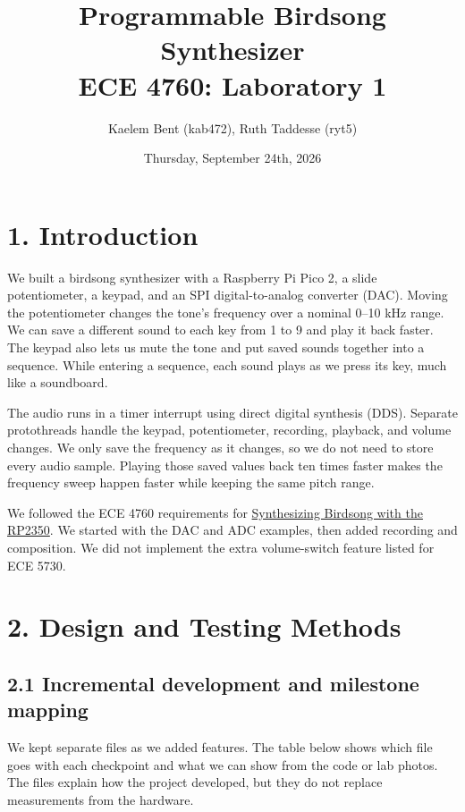 \documentclass[11pt,letterpaper]{article}
\title{Programmable Birdsong Synthesizer\\\large ECE 4760: Laboratory 1}
\author{Kaelem Bent (kab472), Ruth Taddesse (ryt5)}
\date{Thursday, September 24th, 2026}
\begin{document}
\maketitle

\section*{1. Introduction}

We built a birdsong synthesizer with a Raspberry Pi Pico 2, a slide potentiometer, a keypad, and an SPI digital-to-analog converter (DAC). Moving the potentiometer changes the tone's frequency over a nominal 0--10 kHz range. We can save a different sound to each key from 1 to 9 and play it back faster. The keypad also lets us mute the tone and put saved sounds together into a sequence. While entering a sequence, each sound plays as we press its key, much like a soundboard.

The audio runs in a timer interrupt using direct digital synthesis (DDS). Separate protothreads handle the keypad, potentiometer, recording, playback, and volume changes. We only save the frequency as it changes, so we do not need to store every audio sample. Playing those saved values back ten times faster makes the frequency sweep happen faster while keeping the same pitch range.

We followed the ECE 4760 requirements for \href{https://vanhunteradams.com/Pico/Birds/Birdsong.html}{Synthesizing Birdsong with the RP2350}. We started with the DAC and ADC examples, then added recording and composition. We did not implement the extra volume-switch feature listed for ECE 5730.

\section*{2. Design and Testing Methods}

\subsection*{2.1 Incremental development and milestone mapping}

We kept separate files as we added features. The table below shows which file goes with each checkpoint and what we can show from the code or lab photos. The files explain how the project developed, but they do not replace measurements from the hardware.
\end{document}
